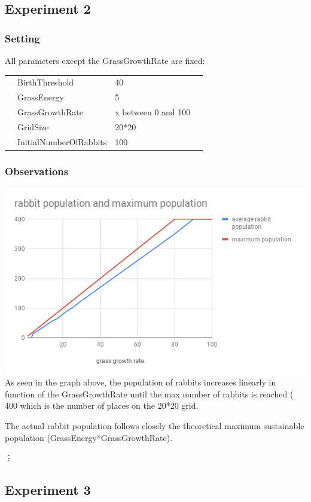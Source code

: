 \documentclass[11pt]{article}
\begin{document}
 \subsection{Experiment 2}
 \subsubsection{Setting}
 All parameters except the GrassGrowthRate are fixed:
 \begin{table}[H]
  \begin{tabular}{llll}
   &BirthThreshold  &40\\
   &GrassEnergy  &5 \\
   &GrassGrowthRate  &x between 0 and 100\\
   &GridSize  &20*20\\
   &InitialNumberOfRabbits  &100
  \end{tabular}
 \end{table}

 \subsubsection{Observations}
 \includegraphics[width=\textwidth]{grassgrowth.png}
 As seen in the graph above, the population of rabbits increases linearly in function of the GrassGrowthRate until the max number of rabbits is reached ( 400 which is the number of places on the 20*20 grid.

 The actual rabbit population follows closely the theoretical maximum sustainable population (GrassEnergy*GrassGrowthRate).

 \vdots

 \subsection{Experiment 3}
\end{document}

